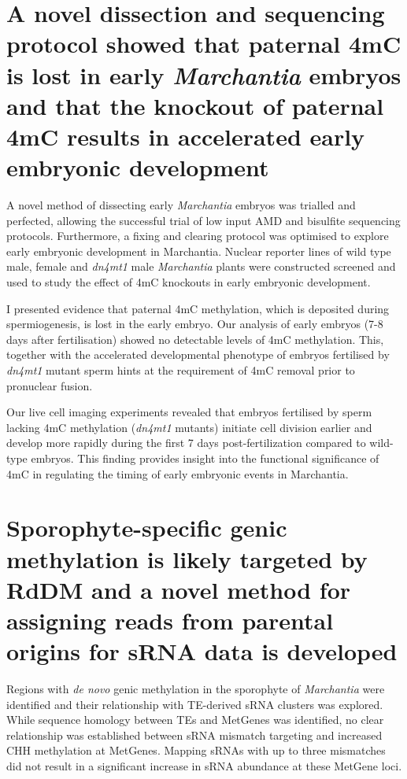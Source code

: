 \section{A novel dissection and sequencing protocol showed that paternal 4mC is lost in early \textit{Marchantia} embryos and that the knockout of paternal 4mC results in accelerated early embryonic development}

A novel method of dissecting early \textit{Marchantia} embryos was trialled and perfected, allowing the successful trial of low input AMD and bisulfite sequencing protocols. Furthermore, a fixing and clearing protocol was optimised to explore early embryonic development in Marchantia. Nuclear reporter lines of wild type male, female and \textit{dn4mt1} male \textit{Marchantia} plants were constructed screened and used to study the effect of 4mC knockouts in early embryonic development.

I presented evidence that  paternal 4mC methylation, which is deposited during spermiogenesis, is lost in the early embryo. Our analysis of early embryos (7-8 days after fertilisation) showed no detectable levels of 4mC methylation. This, together with the accelerated developmental phenotype of embryos fertilised by \textit{dn4mt1} mutant sperm hints at the requirement of 4mC removal prior to pronuclear fusion.

Our live cell imaging experiments revealed that embryos fertilised by sperm lacking 4mC methylation (\textit{dn4mt1} mutants) initiate cell division earlier and develop more rapidly during the first 7 days post-fertilization compared to wild-type embryos. This finding provides insight into the functional significance of 4mC in regulating the timing of early embryonic events in Marchantia.

\section{Sporophyte-specific genic methylation is likely targeted by RdDM and a novel method for assigning reads from parental origins for sRNA data is developed}

Regions with \textit{de novo} genic methylation in the sporophyte of \textit{Marchantia} were identified and their relationship with TE-derived sRNA clusters was explored. While sequence homology between TEs and MetGenes was identified, no clear relationship was established between sRNA mismatch targeting and increased CHH methylation at MetGenes. Mapping sRNAs with up to three mismatches did not result in a significant increase in sRNA abundance at these MetGene loci.

